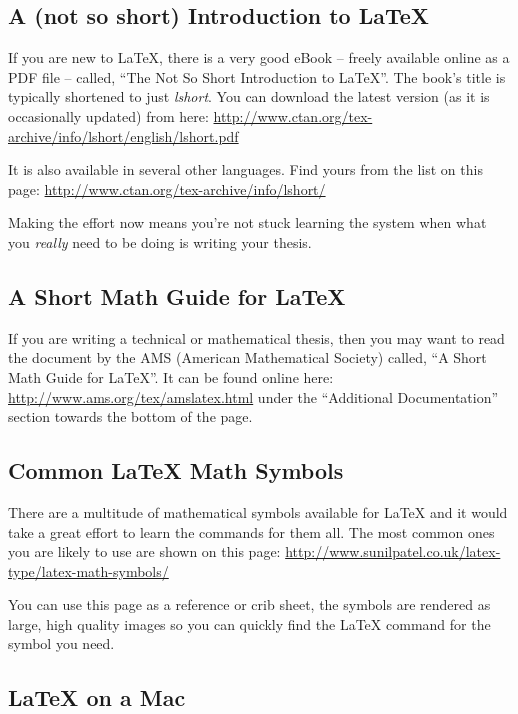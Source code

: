 \subsection{A (not so short) Introduction to \LaTeX{}}

If you are new to \LaTeX{}, there is a very good eBook -- freely available online as a PDF file -- called, \enquote{The Not So Short Introduction to \LaTeX{}}. The book's title is typically shortened to just \emph{lshort}. You can download the latest version (as it is occasionally updated) from here:
\url{http://www.ctan.org/tex-archive/info/lshort/english/lshort.pdf}

It is also available in several other languages. Find yours from the list on this page: \url{http://www.ctan.org/tex-archive/info/lshort/}

Making the effort now means you're not stuck learning the system when what you \emph{really} need to be doing is writing your thesis.

\subsection{A Short Math Guide for \LaTeX{}}

If you are writing a technical or mathematical thesis, then you may want to read the document by the AMS (American Mathematical Society) called, \enquote{A Short Math Guide for \LaTeX{}}. It can be found online here:
\url{http://www.ams.org/tex/amslatex.html}
under the \enquote{Additional Documentation} section towards the bottom of the page.

\subsection{Common \LaTeX{} Math Symbols}
There are a multitude of mathematical symbols available for \LaTeX{} and it would take a great effort to learn the commands for them all. The most common ones you are likely to use are shown on this page:
\url{http://www.sunilpatel.co.uk/latex-type/latex-math-symbols/}

You can use this page as a reference or crib sheet, the symbols are rendered as large, high quality images so you can quickly find the \LaTeX{} command for the symbol you need.

\subsection{\LaTeX{} on a Mac}
 
